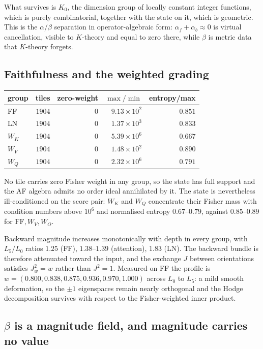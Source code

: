 What survives is $K_0$, the dimension group of locally constant integer
functions, which is purely combinatorial, together with the state on it, which
is geometric. This is the $\alpha$/$\beta$ separation in operator-algebraic
form: $\alpha_f + \alpha_b \approx 0$ is virtual cancellation, visible to
$K$-theory and equal to zero there, while $\beta$ is metric data that
$K$-theory forgets.

\subsection{Faithfulness and the weighted grading}

\begin{center}
\begin{tabular}{lrrrr}
\toprule
group & tiles & zero-weight & $\max/\min$ & entropy/max \\
\midrule
FF    & $1904$ & $0$ & $9.13\times10^{2}$ & $0.851$ \\
LN    & $1904$ & $0$ & $1.37\times10^{3}$ & $0.833$ \\
$W_K$ & $1904$ & $0$ & $5.39\times10^{6}$ & $0.667$ \\
$W_V$ & $1904$ & $0$ & $1.48\times10^{2}$ & $0.890$ \\
$W_Q$ & $1904$ & $0$ & $2.32\times10^{6}$ & $0.791$ \\
\bottomrule
\end{tabular}
\end{center}

No tile carries zero Fisher weight in any group, so the state has full support
and the AF algebra admits no order ideal annihilated by it. The state is
nevertheless ill-conditioned on the score pair: $W_K$ and $W_Q$ concentrate
their Fisher mass with condition numbers above $10^{6}$ and normalised entropy
$0.67$--$0.79$, against $0.85$--$0.89$ for $\mathrm{FF},W_V,W_O$.

Backward magnitude increases monotonically with depth in every group, with
$L_5/L_0$ ratios $1.25$ (FF), $1.38$--$1.39$ (attention), $1.83$ (LN). The
backward bundle is therefore attenuated toward the input, and the exchange
$J$ between orientations satisfies $J_w^2 = w$ rather than $J^2 = 1$. Measured
on FF the profile is $w = (0.800, 0.838, 0.875, 0.936, 0.970, 1.000)$ across
$L_0$ to $L_5$: a mild smooth deformation, so the $\pm1$ eigenspaces remain
nearly orthogonal and the Hodge decomposition survives with respect to the
Fisher-weighted inner product.

\subsection{$\beta$ is a magnitude field, and magnitude carries no value}
\label{sec:magdir}

